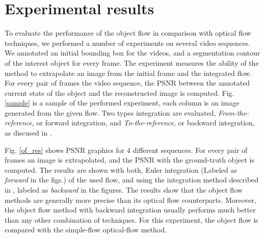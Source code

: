 \section{Experimental results}
To evaluate the performance of the object flow in comparison with optical flow techniques, we performed 
a number of experiments on several video sequences. We annotated an initial bounding box for the videos, 
and a segmentation contour of the interest object for every frame. The experiment measures the ability of the method to 
extrapolate an image from the initial frame and the integrated flow. For every pair of frames the video sequence, the PSNR between the annotated
current state of the object and the reconstructed image is computed. Fig. \ref{sample} is a sample of the performed experiment, each column is an image generated from the given flow. 
Two types integration are evaluated, {\it From-the-reference}, or forward integration, and {\it To-the-reference}, or backward integration, as discused in \cite{c20}. 

Fig. \ref{of_res} shows PSNR graphics for 4 different sequences. For every pair of frames an image is extrapolated, and the PSNR with the ground-truth object is computed.
The results are shown with both, Euler integration (Labeled as {\it forward} in the figs.) of the used flow, 
and using the integration method described in \cite{c20}, labeled as {\it backward} in the figures. The results show that the object flow methods are generally more precise than its optical flow 
counterparts. Moreover, the object flow method with backward integration usually performs much better than any other combination of techniques. For this experiment, the object flow is compared with the simple-flow optical-flow method.

